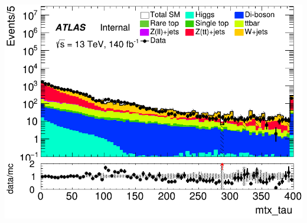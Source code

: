 \documentclass[usenames,dvipsnames]{beamer}
\begin{document}
\begin{frame}
\begin{minipage}{0.32\textwidth}
        \includegraphics[width=\textwidth]{graphics/HH_met/HH_met_mtx_tau.png}
    \end{minipage}
\end{frame}
\end{document}
